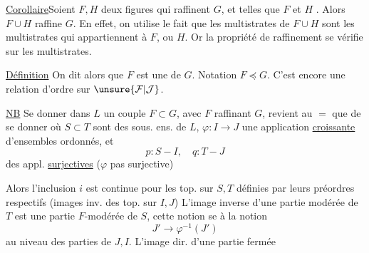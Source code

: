 \uline{Corollaire}\enspace Soient $F,H$ deux figures qui raffinent $G$, et telles que $F$ et $H$  . Alors $F\cup H$ raffine $G$.
En effet, on utilise le fait que les multistrates de $F\cup H$ sont les multistrates  qui appartiennent à $F$, ou  $H$. Or la propriété de raffinement se vérifie sur les multistrates.

\uline{Définition} On dit alors que $F$ est une  de $G$.
Notation $F\preccurlyeq G$. C'est encore une relation d'ordre sur $\unsure{\mathcal F|\mathcal J}$.

\uline{NB} Se donner dans $L$ un couple $F\subset G$, avec $F$ raffinant $G$, revient au $=$ que de se donner
où $S\subset T$ sont des sous. ens. de $L$, $\varphi:I\longrightarrow J$ une application \uline{croissante} d'ensembles ordonnés, et 
\[p:S-I,\quad q:T-J\]
des appl. \uline{surjectives} ($\varphi$ pas  surjective)

Alors l'inclusion $i$ est continue pour les top.  sur $S,T$ définies par leurs préordres respectifs (images inv. des top. sur $I,J$) L'image inverse d'une partie modérée de $T$ est une partie $F$-modérée de $S$, cette notion se  à la notion
\[J'\longrightarrow\varphi^{-1}(J')\]
au niveau des parties de $J,I$. L'image dir. d'une partie fermée

